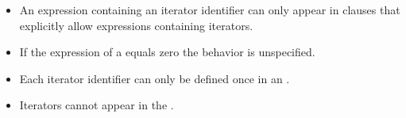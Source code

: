 \restrictions

\begin{itemize}
\item An expression containing an iterator identifier can only appear in clauses that explicitly allow expressions containing iterators.
\item If the  expression of a  equals zero the behavior is unspecified.
\item Each iterator identifier can only be defined once in an .
\item Iterators cannot appear in the .
\end{itemize}


